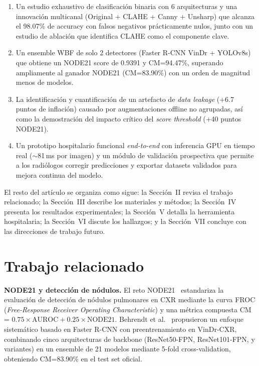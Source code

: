 \documentclass[conference]{IEEEtran}
\begin{document}
\begin{enumerate}
\item Un estudio exhaustivo de clasificaci\'{o}n binaria con 6 arquitecturas y
una innovaci\'{o}n multicanal (Original + CLAHE + Canny + Unsharp) que alcanza
el 98.07\% de accuracy con falsos negativos pr\'{a}cticamente nulos, junto con
un estudio de ablaci\'{o}n que identifica CLAHE como el componente clave.
\item Un ensemble WBF de solo 2 detectores (Faster R-CNN VinDr + YOLOv8s) que
obtiene un NODE21 score de 0.9391 y CM=94.47\%, superando ampliamente al
ganador NODE21 (CM=83.90\%) con un orden de magnitud menos de modelos.
\item La identificaci\'{o}n y cuantificaci\'{o}n de un artefacto de
\textit{data leakage} (+6.7 puntos de inflaci\'{o}n) causado por
augmentaciones offline no agrupadas, as\'{i} como la demostraci\'{o}n del
impacto cr\'{i}tico del \textit{score threshold} (+40 puntos NODE21).
\item Un prototipo hospitalario funcional \textit{end-to-end} con inferencia
GPU en tiempo real ($\sim$81\,ms por imagen) y un m\'{o}dulo de validaci\'{o}n
prospectiva que permite a los radi\'{o}logos corregir predicciones y exportar
datasets validados para mejora continua del modelo.
\end{enumerate}

El resto del art\'{i}culo se organiza como sigue: la Secci\'{o}n~II revisa
el trabajo relacionado; la Secci\'{o}n~III describe los materiales y
m\'{e}todos; la Secci\'{o}n~IV presenta los resultados experimentales; la
Secci\'{o}n~V detalla la herramienta hospitalaria; la Secci\'{o}n~VI discute
los hallazgos; y la Secci\'{o}n~VII concluye con las direcciones de trabajo
futuro.


\section{Trabajo relacionado}

\textbf{NODE21 y detecci\'{o}n de n\'{o}dulos.}
El reto NODE21~\cite{node21challenge} estandariza la evaluaci\'{o}n de
detecci\'{o}n de n\'{o}dulos pulmonares en CXR mediante la curva FROC
(\textit{Free-Response Receiver Operating Characteristic}) y una m\'{e}trica
compuesta CM = $0.75 \times \text{AUROC} + 0.25 \times \text{NODE21}$.
Behrendt et al.~\cite{behrendt2023node21} propusieron un enfoque
sistem\'{a}tico basado en Faster R-CNN con preentrenamiento en VinDr-CXR,
combinando cinco arquitecturas de backbone (ResNet50-FPN, ResNet101-FPN, y
variantes) en un ensemble de 21 modelos mediante 5-fold cross-validation,
obteniendo CM=83.90\% en el test set oficial.
\end{document}
